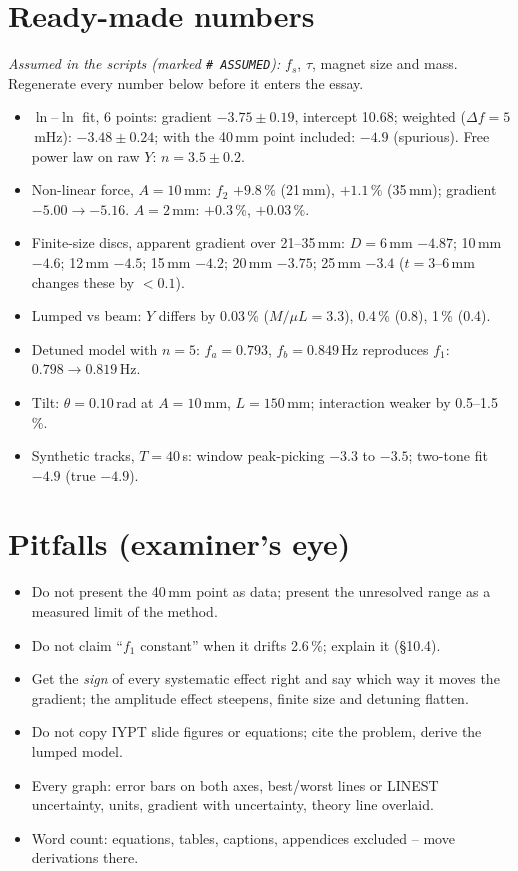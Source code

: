 \documentclass[11pt,a4paper]{article}
\newcommand{\Y}{Y}                       %
\begin{document}
\section{Ready-made numbers}
\begin{notebox}
\emph{Assumed in the scripts (marked \texttt{\# ASSUMED}):} $f_s$, $\tau$, magnet size and
mass. Regenerate every number below before it enters the essay.
\begin{itemize}
\item $\ln$--$\ln$ fit, 6 points: gradient $-3.75\pm0.19$, intercept 10.68; weighted
($\Delta f=5$\,mHz): $-3.48\pm0.24$; with the 40\,mm point included: $-4.9$ (spurious).
Free power law on raw $\Y$: $n=3.5\pm0.2$.
\item Non-linear force, $A=10$\,mm: $f_2$ $+9.8\,\%$ (21\,mm), $+1.1\,\%$ (35\,mm);
gradient $-5.00\to-5.16$. $A=2$\,mm: $+0.3\,\%$, $+0.03\,\%$.
\item Finite-size discs, apparent gradient over 21--35\,mm: $D=6$\,mm $-4.87$; 10\,mm $-4.6$;
12\,mm $-4.5$; 15\,mm $-4.2$; 20\,mm $-3.75$; 25\,mm $-3.4$ ($t=3$--6\,mm changes these by $<0.1$).
\item Lumped vs beam: $\Y$ differs by 0.03\,\% ($M/\mu L=3.3$), 0.4\,\% (0.8), 1\,\% (0.4).
\item Detuned model with $n=5$: $f_a=0.793$, $f_b=0.849$\,Hz reproduces $f_1$: $0.798\to0.819$\,Hz.
\item Tilt: $\theta=0.10$\,rad at $A=10$\,mm, $L=150$\,mm; interaction weaker by 0.5--1.5\,\%.
\item Synthetic tracks, $T=40$\,s: window peak-picking $-3.3$ to $-3.5$; two-tone fit $-4.9$
(true $-4.9$).
\end{itemize}
\end{notebox}

\section{Pitfalls (examiner's eye)}
\begin{itemize}
\item Do not present the 40\,mm point as data; present the unresolved range as a measured
limit of the method.
\item Do not claim ``$f_1$ constant'' when it drifts 2.6\,\%; explain it (\S10.4).
\item Get the \emph{sign} of every systematic effect right and say which way it moves the
gradient; the amplitude effect steepens, finite size and detuning flatten.
\item Do not copy IYPT slide figures or equations; cite the problem, derive the lumped model.
\item Every graph: error bars on both axes, best/worst lines or LINEST uncertainty, units,
gradient with uncertainty, theory line overlaid.
\item Word count: equations, tables, captions, appendices excluded -- move derivations there.
\end{itemize}
\end{document}

